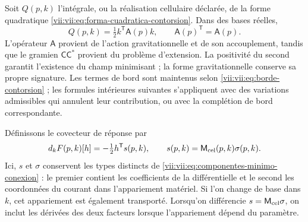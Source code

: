 Soit \(Q(p,k)\) l'intégrale, ou la réalisation cellulaire déclarée, de
la forme quadratique
\eqref{vii:vii:eq:forma-cuadratica-contorsion}. Dans des bases réelles,
\begin{equation}
 Q(p,k)=\tfrac12 k^{\mathsf T}\mathsf A(p)k,
 \qquad \mathsf A(p)^{\mathsf T}=\mathsf A(p).
 \label{vii:vii:eq:cuadratica-celular-contorsion}
\end{equation}
L'opérateur \(\mathsf A\) provient de l'action gravitationnelle et de son accouplement, tandis que le gramien \(\mathsf C\mathsf C^*\) provient du problème d'extension. La positivité du second garantit l'existence du champ minimisant ; la forme gravitationnelle conserve sa propre signature. Les termes de bord sont maintenus selon \eqref{vii:vii:eq:borde-contorsion} ; les formules intérieures suivantes s'appliquent avec des variations admissibles qui annulent leur contribution, ou avec la complétion de bord correspondante.

Définissons le covecteur de réponse par
\begin{equation}
 d_kF(p,k)[h]= -\tfrac12 h^{\mathsf T}s(p,k),
 \qquad s(p,k)=\mathsf M_{\rm cel}(p,k)\sigma(p,k).
 \label{vii:vii:eq:covector-torsional-minimo}
\end{equation}
Ici, \(s\) et \(\sigma\) conservent les types distincts de
\eqref{vii:vii:eq:componentes-minimo-conexion} : le premier contient les
coefficients de la différentielle et le second les coordonnées du
courant dans l'appariement matériel. Si l'on change de base dans
\(k\), cet appariement est également transporté. Lorsqu'on différencie
\(s=\mathsf M_{\rm cel}\sigma\), on inclut les dérivées des
deux facteurs lorsque l'appariement dépend du paramètre.


